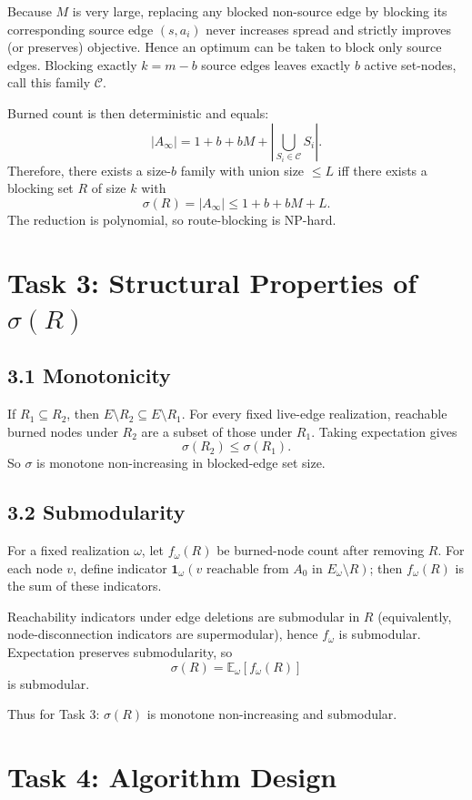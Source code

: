\documentclass[9pt,a4paper]{article}
\begin{document}
Because $M$ is very large, replacing any blocked non-source edge by blocking its
corresponding source edge $(s,a_i)$ never increases spread and strictly improves
(or preserves) objective. Hence an optimum can be taken to block only source
edges. Blocking exactly $k=m-b$ source edges leaves exactly $b$ active set-nodes,
call this family $\mathcal{C}$.

Burned count is then deterministic and equals:
\[
|A_\infty| = 1 + b + bM + \left|\bigcup_{S_i\in\mathcal{C}} S_i\right|.
\]
Therefore, there exists a size-$b$ family with union size $\le L$ iff there
exists a blocking set $R$ of size $k$ with
\[
\sigma(R) = |A_\infty| \le 1+b+bM+L.
\]
The reduction is polynomial, so route-blocking is NP-hard.

\section*{Task 3: Structural Properties of $\sigma(R)$}
\subsection*{3.1 Monotonicity}
If $R_1\subseteq R_2$, then $E\setminus R_2\subseteq E\setminus R_1$.
For every fixed live-edge realization, reachable burned nodes under $R_2$ are a
subset of those under $R_1$. Taking expectation gives
\[
\sigma(R_2)\le \sigma(R_1).
\]
So $\sigma$ is monotone non-increasing in blocked-edge set size.

\subsection*{3.2 Submodularity}
For a fixed realization $\omega$, let $f_\omega(R)$ be burned-node count after
removing $R$. For each node $v$, define indicator
$\mathbf{1}_\omega(v\text{ reachable from }A_0\text{ in }E_\omega\setminus R)$;
then $f_\omega(R)$ is the sum of these indicators.

Reachability indicators under edge deletions are submodular in $R$ (equivalently,
node-disconnection indicators are supermodular), hence $f_\omega$ is submodular.
Expectation preserves submodularity, so
\[
\sigma(R)=\mathbb{E}_\omega[f_\omega(R)]
\]
is submodular.

Thus for Task 3: $\sigma(R)$ is monotone non-increasing and submodular.

\section*{Task 4: Algorithm Design}
\end{document}
